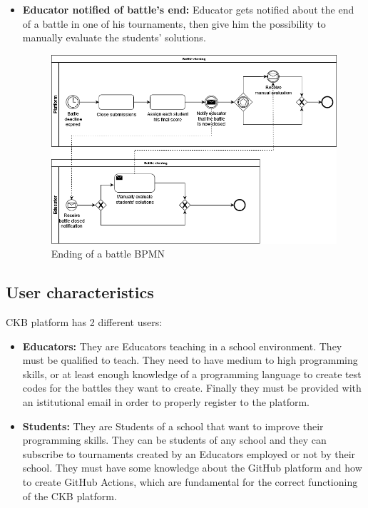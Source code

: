 \documentclass{article}
\begin{document}
{\begin{itemize}
    \item \textbf{Educator notified of battle's end:} Educator gets notified about the end of a battle in one of his tournaments, 
    then give him the possibility to manually evaluate the students' solutions.
          \begin{figure}[H]
              \centering
              \includegraphics[scale=0.35]{images/BPMN/BPMN12.png}
              \caption{Ending of a battle BPMN}
              \label{fig:battleEndingBPMN}
          \end{figure}
\end{itemize}

\subsection{User characteristics}
CKB platform has 2 different users:
\begin{itemize}
    \item \textbf{Educators:} They are Educators teaching in a school
          environment. They must be qualified to teach. They need to have
          medium to high programming skills, or at least enough knowledge of a programming language
          to create test codes for the battles they want to create.
          Finally they must be provided with an istitutional email in order to properly
          register to the platform.
    \item \textbf{Students:} They are Students of a school that want to
          improve their programming skills. They can be students of any school and they
          can subscribe to tournaments created by an Educators
          employed or not by their school. They must have some knowledge about the GitHub
          platform and how to create GitHub Actions, which are fundamental for the correct
          functioning of the CKB platform.
\end{itemize}

}
\end{document}
